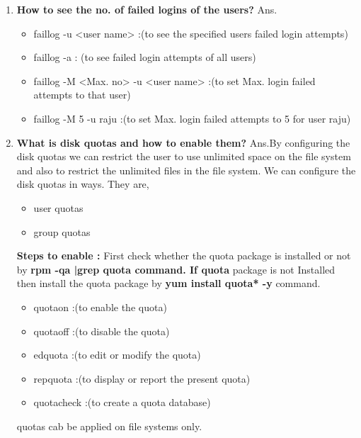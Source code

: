 \begin{enumerate}
    \bigskip
    \bigskip
    
    \item \textbf{How to see the no. of failed logins of the users?}
    \newline
     Ans.\begin{itemize}
          \item faillog    -u    <user name> :(to see the specified users failed login attempts)
          \item faillog    -a 	: (to see failed login attempts of all users)
          \item faillog    -M  <Max. no>    -u    <user name>	:(to set Max. login failed attempts to that user)
          \item faillog    -M  5    -u    raju	:(to set Max. login failed attempts to 5 for user raju)
        \end{itemize}

    \bigskip
    \bigskip

    \item \textbf{What is disk quotas and how to enable them?}
    \newline
    Ans.By configuring the disk quotas we can restrict the user to use unlimited space on the file system and 
        also to 	restrict the unlimited files in the file system. We can configure the disk quotas in ways. They are,
      \begin{itemize}
        \item user quotas
        \item 	group quotas
      \end{itemize}
     \textbf{Steps to enable :}
     First check whether the quota package is installed  or  not  by \textbf{rpm    -qa  |grep   quota    command. If quota}	package is not Installed then install the  quota package by \textbf{yum  install  quota*   -y }   command.
      \begin{itemize}
        \item quotaon	:(to enable the quota)
        \item  quotaoff	:(to disable the quota)
        \item  edquota	:(to edit  or  modify the quota)
        \item repquota	:(to display  or  report the present quota)
        \item quotacheck :(to create a quota database)
      \end{itemize}
    quotas  cab be applied on file systems only.


\end{enumerate}
